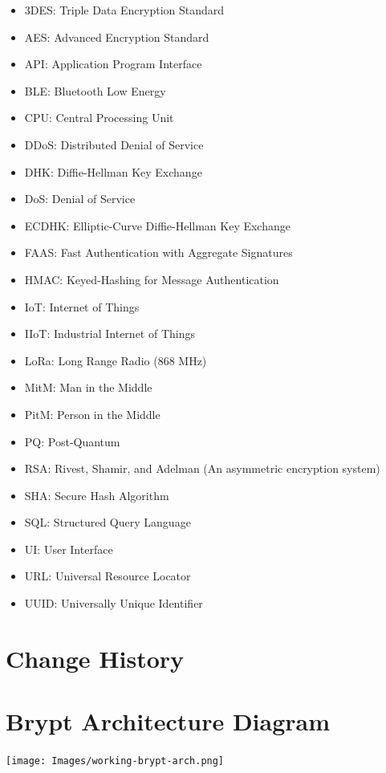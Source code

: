 \documentclass[tikz,a4paper,titlepage]{article}
\begin{document}
\begin{itemize}
    \item 3DES: Triple Data Encryption Standard
    \item AES: Advanced Encryption Standard
    \item API: Application Program Interface
    \item BLE: Bluetooth Low Energy
    \item CPU: Central Processing Unit
    \item DDoS: Distributed Denial of Service
    \item DHK: Diffie-Hellman Key Exchange
    \item DoS: Denial of Service
    \item ECDHK: Elliptic-Curve Diffie-Hellman Key Exchange
    \item FAAS: Fast Authentication with Aggregate Signatures
    \item HMAC: Keyed-Hashing for Message Authentication
    \item IoT: Internet of Things
    \item IIoT: Industrial Internet of Things
    \item LoRa: Long Range Radio (868 MHz)
    \item MitM: Man in the Middle
    \item PitM: Person in the Middle
    \item PQ: Post-Quantum
    \item RSA: Rivest, Shamir, and Adelman (An asymmetric encryption system)
    \item SHA: Secure Hash Algorithm
    \item SQL: Structured Query Language
    \item UI: User Interface
    \item URL: Universal Resource Locator
    \item UUID: Universally Unique Identifier
\end{itemize}

%
%

\section{Change History}

\newpage    
\appendix

\section{Brypt Architecture Diagram}
\texttt{[image: Images/working-brypt-arch.png]}
\end{document}
